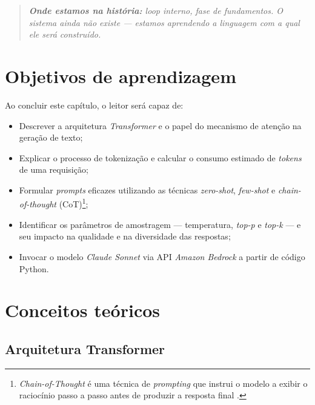 \begin{quote}\itshape
\textbf{Onde estamos na hist\'oria:} loop interno, fase de fundamentos.
O sistema ainda n\~ao existe --- estamos aprendendo a linguagem com a
qual ele ser\'a constru\'ido.
\end{quote}

\section{Objetivos de aprendizagem}

Ao concluir este cap\'itulo, o leitor ser\'a capaz de:

\begin{itemize}[leftmargin=*]
  \item Descrever a arquitetura \textit{Transformer} e o papel do mecanismo
        de aten\c{c}\~ao na gera\c{c}\~ao de texto;
  \item Explicar o processo de tokeniza\c{c}\~ao e calcular o consumo
        estimado de \textit{tokens} de uma requisi\c{c}\~ao;
  \item Formular \textit{prompts} eficazes utilizando as t\'ecnicas
        \textit{zero-shot}, \textit{few-shot} e
        \textit{chain-of-thought} (CoT)\footnote{%
          \textit{Chain-of-Thought} \'e uma t\'ecnica de
          \textit{prompting} que instrui o modelo a exibir o racioc\'inio
          passo a passo antes de produzir a resposta final
          \cite{wei2022chain}.};
  \item Identificar os par\^ametros de amostragem --- temperatura,
        \textit{top-p} e \textit{top-k} --- e seu impacto na qualidade
        e na diversidade das respostas;
  \item Invocar o modelo \textit{Claude Sonnet} via API
        \textit{Amazon Bedrock} a partir de c\'odigo Python.
\end{itemize}

\section{Conceitos te\'oricos}

\subsection{Arquitetura Transformer}

